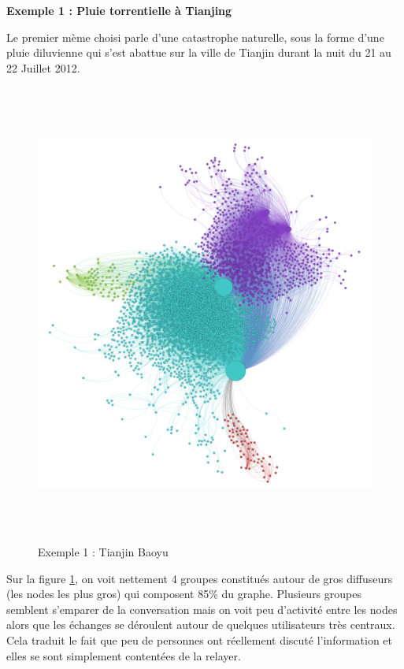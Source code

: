 \textbf{Exemple 1 : Pluie torrentielle à Tianjing}

Le premier mème choisi parle d{\textquoteright}une catastrophe naturelle, sous la forme d{\textquoteright}une pluie diluvienne qui s{\textquoteright}est abattue sur la ville de Tianjin durant la nuit du 21 au 22 Juillet 2012.

\begin{figure}[h!]
    \centering
    \includegraphics[width=6in,height=6in]{figures/chap3/chapitre3-img17.png}
    \caption{Exemple 1 : Tianjin Baoyu}
    \label{fig:graph-tianjin}
\end{figure}

Sur la figure \ref{fig:graph-tianjin}, on voit nettement 4 groupes constitués autour de gros diffuseurs (les nodes les plus gros) qui composent 85\% du graphe. Plusieurs groupes semblent s{\textquoteright}emparer de la conversation mais on voit peu d{\textquoteright}activité entre les nodes alors que les échanges se déroulent autour de quelques utilisateurs très centraux. Cela traduit le fait que peu de personnes ont réellement discuté l{\textquoteright}information et elles se sont simplement contentées de la relayer.


